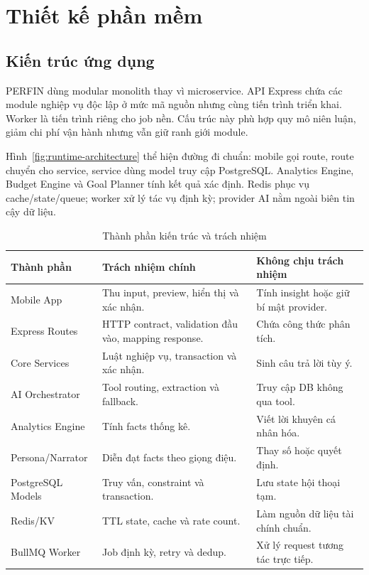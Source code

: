 \section{Thiết kế phần mềm}

\subsection{Kiến trúc ứng dụng}

PERFIN dùng modular monolith thay vì microservice. API Express chứa các module nghiệp vụ độc lập ở mức mã nguồn nhưng cùng tiến trình triển khai. Worker là tiến trình riêng cho job nền. Cấu trúc này phù hợp quy mô niên luận, giảm chi phí vận hành nhưng vẫn giữ ranh giới module.


Hình~\ref{fig:runtime-architecture} thể hiện đường đi chuẩn: mobile gọi route, route chuyển cho service, service dùng model truy cập PostgreSQL. Analytics Engine, Budget Engine và Goal Planner tính kết quả xác định. Redis phục vụ cache/state/queue; worker xử lý tác vụ định kỳ; provider AI nằm ngoài biên tin cậy dữ liệu.

\begin{table}[H]
  \centering
  \caption{Thành phần kiến trúc và trách nhiệm}
  \label{tab:components}
  \begin{tabularx}{\textwidth}{@{}L{3.4cm}Y Y@{}}
    \toprule
    \textbf{Thành phần} & \textbf{Trách nhiệm chính} & \textbf{Không chịu trách nhiệm} \\
    \midrule
    Mobile App & Thu input, preview, hiển thị và xác nhận. & Tính insight hoặc giữ bí mật provider. \\
    Express Routes & HTTP contract, validation đầu vào, mapping response. & Chứa công thức phân tích. \\
    Core Services & Luật nghiệp vụ, transaction và xác nhận. & Sinh câu trả lời tùy ý. \\
    AI Orchestrator & Tool routing, extraction và fallback. & Truy cập DB không qua tool. \\
    Analytics Engine & Tính facts thống kê. & Viết lời khuyên cá nhân hóa. \\
    Persona/Narrator & Diễn đạt facts theo giọng điệu. & Thay số hoặc quyết định. \\
    PostgreSQL Models & Truy vấn, constraint và transaction. & Lưu state hội thoại tạm. \\
    Redis/KV & TTL state, cache và rate count. & Làm nguồn dữ liệu tài chính chuẩn. \\
    BullMQ Worker & Job định kỳ, retry và dedup. & Xử lý request tương tác trực tiếp. \\
    \bottomrule
  \end{tabularx}
\end{table}

